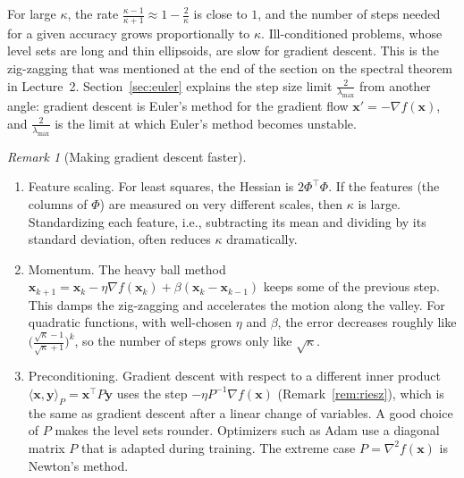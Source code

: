 \documentclass[11pt]{article}
\newcommand{\ip}[2]{\langle #1, #2 \rangle}
\theoremstyle{definition}
\theoremstyle{plain}
\theoremstyle{remark}
\newtheorem{remark}[definition]{Remark}
\begin{document}
For large $\kappa$, the rate $\frac{\kappa - 1}{\kappa + 1} \approx 1 - \frac{2}{\kappa}$ is close to $1$, and the number of steps needed for a given accuracy grows proportionally to $\kappa$. Ill-conditioned problems, whose level sets are long and thin ellipsoids, are slow for gradient descent. This is the zig-zagging that was mentioned at the end of the section on the spectral theorem in Lecture~2. Section~\ref{sec:euler} explains the step size limit $\frac{2}{\lambda_{\max}}$ from another angle: gradient descent is Euler's method for the gradient flow $\mathbf{x}' = -\nabla f(\mathbf{x})$, and $\frac{2}{\lambda_{\max}}$ is the limit at which Euler's method becomes unstable.

\begin{remark}[Making gradient descent faster]
    \begin{enumerate}
        \item Feature scaling. For least squares, the Hessian is $2\Phi^\top\Phi$. If the features (the columns of $\Phi$) are measured on very different scales, then $\kappa$ is large. Standardizing each feature, i.e., subtracting its mean and dividing by its standard deviation, often reduces $\kappa$ dramatically.
        \item Momentum. The heavy ball method $\mathbf{x}_{k+1} = \mathbf{x}_k - \eta\nabla f(\mathbf{x}_k) + \beta(\mathbf{x}_k - \mathbf{x}_{k-1})$ keeps some of the previous step. This damps the zig-zagging and accelerates the motion along the valley. For quadratic functions, with well-chosen $\eta$ and $\beta$, the error decreases roughly like $\big(\frac{\sqrt{\kappa} - 1}{\sqrt{\kappa} + 1}\big)^k$, so the number of steps grows only like $\sqrt{\kappa}$.
        \item Preconditioning. Gradient descent with respect to a different inner product $\ip{\mathbf{x}}{\mathbf{y}}_P = \mathbf{x}^\top P\mathbf{y}$ uses the step $-\eta P^{-1}\nabla f(\mathbf{x})$ (Remark~\ref{rem:riesz}), which is the same as gradient descent after a linear change of variables. A good choice of $P$ makes the level sets rounder. Optimizers such as Adam use a diagonal matrix $P$ that is adapted during training. The extreme case $P = \nabla^2 f(\mathbf{x})$ is Newton's method.
    \end{enumerate}
\end{remark}
\end{document}
